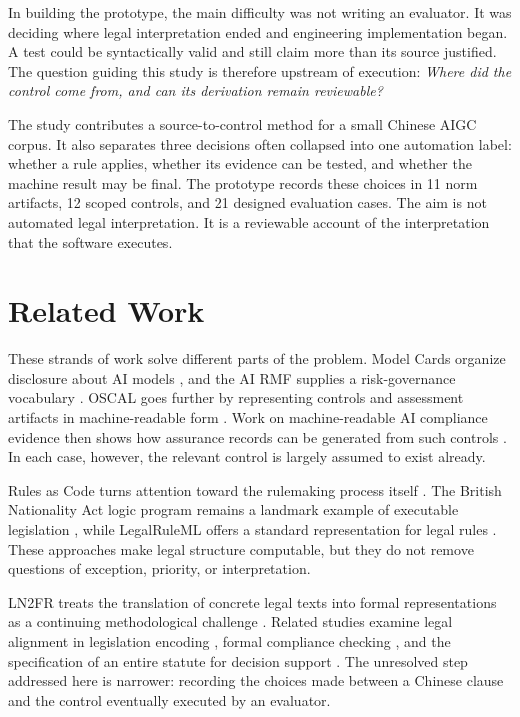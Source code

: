 \documentclass{IOS-Book-Article}
\begin{document}
In building the prototype, the main difficulty was not writing an evaluator. It was deciding where legal interpretation ended and engineering implementation began. A test could be syntactically valid and still claim more than its source justified. The question guiding this study is therefore upstream of execution: \emph{Where did the control come from, and can its derivation remain reviewable?}

The study contributes a source-to-control method for a small Chinese AIGC corpus. It also separates three decisions often collapsed into one automation label: whether a rule applies, whether its evidence can be tested, and whether the machine result may be final. The prototype records these choices in 11 norm artifacts, 12 scoped controls, and 21 designed evaluation cases. The aim is not automated legal interpretation. It is a reviewable account of the interpretation that the software executes.

\section{Related Work}

These strands of work solve different parts of the problem. Model Cards organize disclosure about AI models \cite{mitchell2019model}, and the AI RMF supplies a risk-governance vocabulary \cite{nistAiRmf2023}. OSCAL goes further by representing controls and assessment artifacts in machine-readable form \cite{nistOscal}. Work on machine-readable AI compliance evidence then shows how assurance records can be generated from such controls \cite{ugarte2026evidence}. In each case, however, the relevant control is largely assumed to exist already.

Rules as Code turns attention toward the rulemaking process itself \cite{mohun2020cracking}. The British Nationality Act logic program remains a landmark example of executable legislation \cite{sergot1986nationality}, while LegalRuleML offers a standard representation for legal rules \cite{legalRuleMl2021}. These approaches make legal structure computable, but they do not remove questions of exception, priority, or interpretation.

LN2FR treats the translation of concrete legal texts into formal representations as a continuing methodological challenge \cite{borges2023ln2fr}. Related studies examine legal alignment in legislation encoding \cite{witt2024encoding}, formal compliance checking \cite{francesconi2023patterns,calimeri2023compliance}, and the specification of an entire statute for decision support \cite{doesburg2019aliens}. The unresolved step addressed here is narrower: recording the choices made between a Chinese clause and the control eventually executed by an evaluator.
\end{document}
